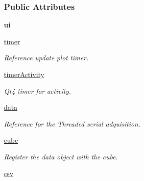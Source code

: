\subsubsection*{Public Attributes}
\begin{DoxyCompactItemize}
\item 
\hypertarget{classmain_1_1_main_window_ad4a5b9271a2213e10f7117bfa4f230f1}{{\bfseries ui}}\label{classmain_1_1_main_window_ad4a5b9271a2213e10f7117bfa4f230f1}

\item 
\hyperlink{classmain_1_1_main_window_ac830383d366fc669473cc4d94ab64efb}{timer}
\begin{DoxyCompactList}\small\item\em Reference update plot timer. \end{DoxyCompactList}\item 
\hypertarget{classmain_1_1_main_window_a4f2e2eac4efccf363c3b99c41ad14c48}{\hyperlink{classmain_1_1_main_window_a4f2e2eac4efccf363c3b99c41ad14c48}{timer\-Activity}}\label{classmain_1_1_main_window_a4f2e2eac4efccf363c3b99c41ad14c48}

\begin{DoxyCompactList}\small\item\em Qt4 timer for activity. \end{DoxyCompactList}\item 
\hyperlink{classmain_1_1_main_window_af7e14bdf821dcadf59ff9a25fdedacc6}{data}
\begin{DoxyCompactList}\small\item\em Reference for the Threaded serial adquisition. \end{DoxyCompactList}\item 
\hypertarget{classmain_1_1_main_window_aa93b2cedd13107177781d0044d78e8a0}{\hyperlink{classmain_1_1_main_window_aa93b2cedd13107177781d0044d78e8a0}{cube}}\label{classmain_1_1_main_window_aa93b2cedd13107177781d0044d78e8a0}

\begin{DoxyCompactList}\small\item\em Register the data object with the cube. \end{DoxyCompactList}\item 
\hypertarget{classmain_1_1_main_window_ac61cc125fc2941916e357bb8219a16ef}{\hyperlink{classmain_1_1_main_window_ac61cc125fc2941916e357bb8219a16ef}{csv}}\label{classmain_1_1_main_window_ac61cc125fc2941916e357bb8219a16ef}


\end{DoxyCompactItemize}
